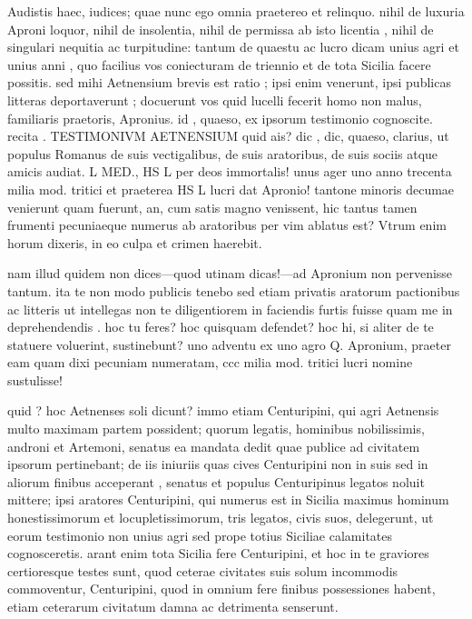  Audistis haec, iudices; quae nunc ego omnia praetereo et relinquo. nihil de luxuria Aproni loquor, nihil de insolentia, nihil de permissa ab isto licentia , nihil de singulari nequitia ac turpitudine: tantum de quaestu ac lucro dicam unius agri et unius anni , quo facilius vos coniecturam de triennio et de tota Sicilia facere possitis. sed mihi Aetnensium brevis est ratio ; ipsi enim venerunt, ipsi publicas litteras deportaverunt ; docuerunt vos quid lucelli fecerit homo non malus, familiaris praetoris, Apronius. id , quaeso, ex ipsorum testimonio cognoscite. recita . TESTIMONIVM AETNENSIUM quid ais? dic , dic, quaeso, clarius, ut populus Romanus de suis vectigalibus, de suis aratoribus, de suis sociis atque amicis audiat. L MED., HS L per deos immortalis! unus ager uno anno trecenta milia mod. tritici et praeterea HS L lucri dat Apronio! tantone minoris decumae venierunt quam fuerunt, an, cum satis magno venissent, hic tantus tamen frumenti pecuniaeque numerus ab aratoribus per vim ablatus est? Vtrum enim horum dixeris, in eo culpa et crimen haerebit.

 nam illud quidem non dices—quod utinam dicas!—ad Apronium non pervenisse tantum. ita te non modo publicis tenebo sed etiam privatis aratorum pactionibus ac litteris ut intellegas non te diligentiorem in faciendis furtis fuisse quam me in deprehendendis . hoc tu feres? hoc quisquam defendet? hoc hi, si aliter de te statuere voluerint, sustinebunt? uno adventu ex uno agro Q. Apronium, praeter eam quam dixi pecuniam numeratam, ccc milia mod. tritici lucri nomine sustulisse!

 quid ? hoc Aetnenses soli dicunt? immo etiam Centuripini, qui agri Aetnensis multo maximam partem possident; quorum legatis, hominibus nobilissimis, androni et Artemoni, senatus ea mandata dedit quae publice ad civitatem ipsorum pertinebant; de iis iniuriis quas cives Centuripini non in suis sed in aliorum finibus acceperant , senatus et populus Centuripinus legatos noluit mittere; ipsi aratores Centuripini, qui numerus est in Sicilia maximus hominum honestissimorum et locupletissimorum, tris legatos, civis suos, delegerunt, ut eorum testimonio non unius agri sed prope totius Siciliae calamitates cognosceretis. arant enim tota Sicilia fere Centuripini, et hoc in te graviores certioresque testes sunt, quod ceterae civitates suis solum incommodis commoventur, Centuripini, quod in omnium fere finibus possessiones habent, etiam ceterarum civitatum damna ac detrimenta senserunt.


